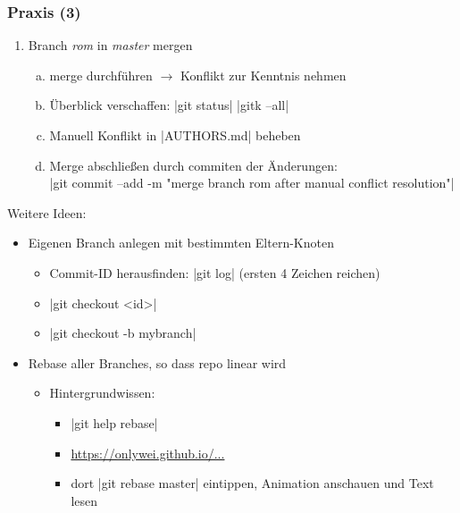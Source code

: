\documentclass{beamer}
\begin{document}
\begin{frame}[fragile,label=uebung40]
\frametitle{Praxis (3)}
\begin{enumerate}
 \setcounter{enumi}{\value{taskcounter}}
 \item Branch \textit{rom} in \textit{master} mergen
 \begin{enumerate}[a)]
 \item merge durchführen $\rightarrow$ Konflikt zur Kenntnis nehmen
 \item Überblick verschaffen: \cverb|git status|  \cverb|gitk --all|
 \item Manuell Konflikt in \cverb|AUTHORS.md| beheben
 \item Merge abschließen durch commiten der Änderungen:\\
 {\tiny \cverb|git commit --add -m "merge branch rom after manual conflict resolution"|}
 \end{enumerate}

 \setcounter{taskcounter}{\value{enumi}}
\end{enumerate}

Weitere Ideen:
\begin{itemize}
 \item Eigenen Branch anlegen mit bestimmten Eltern-Knoten
 \begin{itemize}
  \item Commit-ID herausfinden: \cverb|git log| (ersten 4 Zeichen reichen)
  \item \cverb|git checkout <id>|
  \item \cverb|git checkout -b mybranch|
 \end{itemize}
 \item Rebase aller Branches, so dass repo linear wird
 \begin{itemize}
  \item Hintergrundwissen:
  \begin{itemize}
   \item  \cverb|git help rebase|
\item \href{https://onlywei.github.io/explain-git-with-d3/#rebase}{https://onlywei.github.io/...}
  \item dort \cverb|git rebase master| eintippen, Animation anschauen und Text lesen
  \end{itemize}
 \end{itemize}

\end{itemize}

\end{frame}
\end{document}
